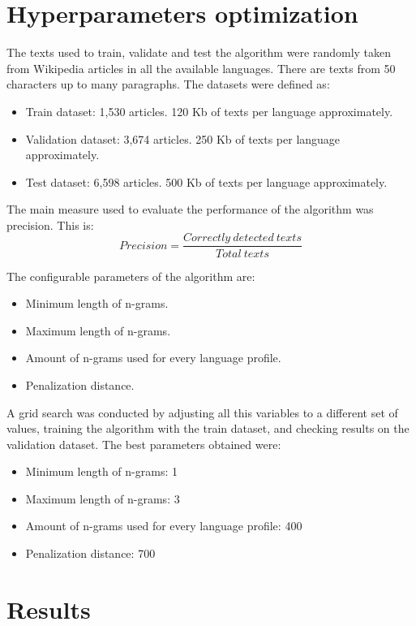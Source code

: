 \documentclass{llncs}
\begin{document}
\section{Hyperparameters optimization}
The texts used to train, validate and test the algorithm were randomly taken from Wikipedia articles in all the available languages. There are texts from 50 characters up to many paragraphs. The datasets were defined as: 
\begin{itemize}
	\item Train dataset: 1,530 articles. 120 Kb of texts per language approximately.
	\item Validation dataset: 3,674 articles. 250 Kb of texts per language approximately.
	\item Test dataset: 6,598 articles. 500 Kb of texts per language approximately.
\end{itemize}

The main measure used to evaluate the performance of the algorithm was precision. This is:
\begin{equation}
Precision = \frac{Correctly\:detected\:texts}
{Total\:texts}
\end{equation}

The configurable parameters of the algorithm are:
\begin{itemize}
	\item Minimum length of n-grams.
	\item Maximum length of n-grams.
	\item Amount of n-grams used for every language profile.
	\item Penalization distance.
\end{itemize}

A grid search was conducted by adjusting all this variables to a different set of values, training the algorithm with the train dataset, and checking results on the validation dataset. The best parameters obtained were:
\begin{itemize}
	\item Minimum length of n-grams: 1
	\item Maximum length of n-grams: 3
	\item Amount of n-grams used for every language profile: 400
	\item Penalization distance: 700
\end{itemize}



\section{Results}
\end{document}
